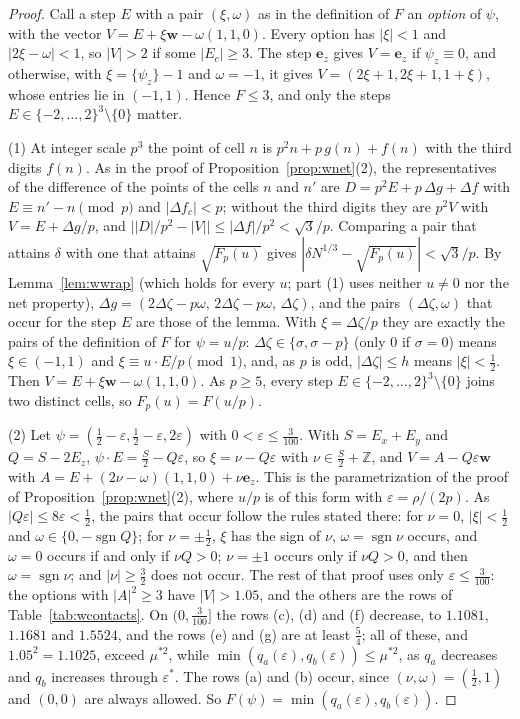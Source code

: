 \documentclass[11pt]{amsart}
\theoremstyle{definition}
\theoremstyle{plain}
\newcommand{\Z}{\mathbb{Z}}
\newcommand{\e}{\mathbf{e}}
\DeclareMathOperator{\sgn}{sgn}
\begin{document}
\begin{proof}
Call a step $E$ with a pair $(\xi,\omega)$ as in the definition of $F$ an \emph{option} of $\psi$, with the vector $V=E+\xi\mathbf w-\omega(1,1,0)$. Every option has $|\xi|<1$ and $|2\xi-\omega|<1$, so $|V|>2$ if some $|E_c|\ge3$. The step $\e_z$ gives $V=\e_z$ if $\psi_z\equiv0$, and otherwise, with $\xi=\{\psi_z\}-1$ and $\omega=-1$, it gives $V=(2\xi+1,2\xi+1,1+\xi)$, whose entries lie in $(-1,1)$. Hence $F\le3$, and only the steps $E\in\{-2,\dots,2\}^3\setminus\{0\}$ matter.

(1) At integer scale $p^3$ the point of cell $n$ is $p^2n+p\,g(n)+f(n)$ with the third digits $f(n)$. As in the proof of Proposition~\ref{prop:wnet}(2), the representatives of the difference of the points of the cells $n$ and $n'$ are $D=p^2E+p\,\Delta g+\Delta f$ with $E\equiv n'-n\pmod p$ and $|\Delta f_c|<p$; without the third digits they are $p^2V$ with $V=E+\Delta g/p$, and $\bigl||D|/p^2-|V|\bigr|\le|\Delta f|/p^2<\sqrt3/p$. Comparing a pair that attains $\delta$ with one that attains $\sqrt{F_p(u)}$ gives $|\delta N^{1/3}-\sqrt{F_p(u)}|<\sqrt3/p$. By Lemma~\ref{lem:wwrap} (which holds for every $u$; part (1) uses neither $u\ne0$ nor the net property), $\Delta g=(2\Delta\zeta-p\omega,\,2\Delta\zeta-p\omega,\,\Delta\zeta)$, and the pairs $(\Delta\zeta,\omega)$ that occur for the step $E$ are those of the lemma. With $\xi=\Delta\zeta/p$ they are exactly the pairs of the definition of $F$ for $\psi=u/p$: $\Delta\zeta\in\{\sigma,\sigma-p\}$ (only $0$ if $\sigma=0$) means $\xi\in(-1,1)$ and $\xi\equiv u\cdot E/p\pmod1$, and, as $p$ is odd, $|\Delta\zeta|\le h$ means $|\xi|<\frac12$. Then $V=E+\xi\mathbf w-\omega(1,1,0)$. As $p\ge5$, every step $E\in\{-2,\dots,2\}^3\setminus\{0\}$ joins two distinct cells, so $F_p(u)=F(u/p)$.

(2) Let $\psi=(\frac12-\varepsilon,\frac12-\varepsilon,2\varepsilon)$ with $0<\varepsilon\le\frac3{100}$. With $S=E_x+E_y$ and $Q=S-2E_z$, $\psi\cdot E=\frac S2-Q\varepsilon$, so $\xi=\nu-Q\varepsilon$ with $\nu\in\frac S2+\Z$, and $V=A-Q\varepsilon\mathbf w$ with $A=E+(2\nu-\omega)(1,1,0)+\nu\e_z$. This is the parametrization of the proof of Proposition~\ref{prop:wnet}(2), where $u/p$ is of this form with $\varepsilon=\rho/(2p)$. As $|Q\varepsilon|\le8\varepsilon<\frac12$, the pairs that occur follow the rules stated there: for $\nu=0$, $|\xi|<\frac12$ and $\omega\in\{0,-\sgn Q\}$; for $\nu=\pm\frac12$, $\xi$ has the sign of $\nu$, $\omega=\sgn \nu$ occurs, and $\omega=0$ occurs if and only if $\nu Q>0$; $\nu=\pm1$ occurs only if $\nu Q>0$, and then $\omega=\sgn \nu$; and $|\nu|\ge\frac32$ does not occur. The rest of that proof uses only $\varepsilon\le\frac3{100}$: the options with $|A|^2\ge3$ have $|V|>1.05$, and the others are the rows of Table~\ref{tab:wcontacts}. On $(0,\frac3{100}]$ the rows (c), (d) and (f) decrease, to $1.1081$, $1.1681$ and $1.5524$, and the rows (e) and (g) are at least $\frac54$; all of these, and $1.05^2=1.1025$, exceed $\mu^{*2}$, while $\min(q_a(\varepsilon),q_b(\varepsilon))\le\mu^{*2}$, as $q_a$ decreases and $q_b$ increases through $\varepsilon^*$. The rows (a) and (b) occur, since $(\nu,\omega)=(\frac12,1)$ and $(0,0)$ are always allowed. So $F(\psi)=\min(q_a(\varepsilon),q_b(\varepsilon))$.


\end{proof}
\end{document}
